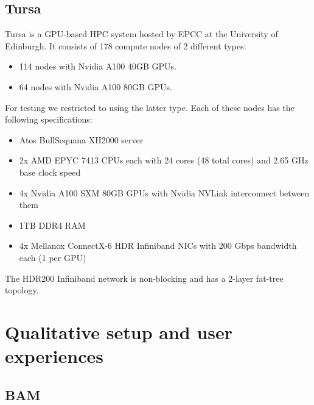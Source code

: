 \documentclass[12pt,a4paper]{article}
\numberwithin{figure}{subsection}
\begin{document}
\subsection{Tursa}
Tursa is a GPU-based HPC system hosted by EPCC at the University of Edinburgh.
It consists of 178 compute nodes of 2 different types:
\begin{itemize}
    \item 114 nodes with Nvidia A100 40GB GPUs.
    \item 64 nodes with Nvidia A100 80GB GPUs.
\end{itemize}
For testing we restricted to using the latter type. Each of these nodes has
the following specifications:
\begin{itemize}
    \item Atos BullSequana XH2000 server
    \item 2x AMD EPYC 7413 CPUs each with 24 cores (48 total cores) and 2.65 GHz
    base clock speed
    \item 4x Nvidia A100 SXM 80GB GPUs with Nvidia NVLink interconnect between
    them
    \item 1TB DDR4 RAM
    \item 4x Mellanox ConnectX-6 HDR Infiniband NICs with 200 Gbps bandwidth
    each (1 per GPU)
\end{itemize}
The HDR200 Infiniband network is non-blocking and has a 2-layer fat-tree
topology.

\section{Qualitative setup and user experiences}
\label{sec:usability}

\subsection{BAM}
\end{document}
